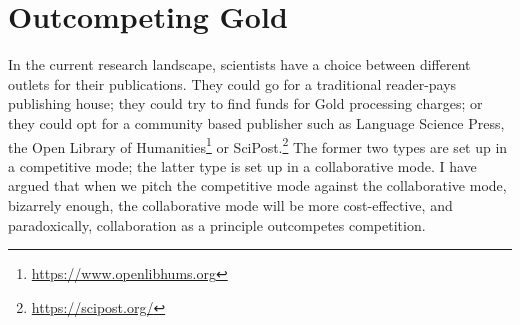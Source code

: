\documentclass[12pt]{article}
\newcommand\wordcount{}
\begin{document}
 
\section{Outcompeting Gold}            
In the current research landscape, scientists have a choice between different outlets for their publications. They could go for a traditional reader-pays publishing house; they could try to find funds for Gold processing charges; or they could opt for a community based publisher such as Language Science Press, the Open Library of Humanities\footnote{\url{https://www.openlibhums.org}} or SciPost.\footnote{\url{https://scipost.org/}}  The former two types are set up in a competitive mode; the latter type is set up in a collaborative mode. I have argued that when we pitch the competitive mode against the collaborative mode, bizarrely enough, the collaborative mode will be more cost-effective, and paradoxically, collaboration as a principle outcompetes competition. 
 

\sloppy
\printbibliography


\wordcount
\end{document}

